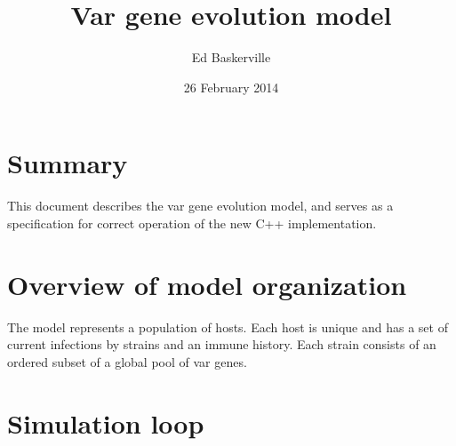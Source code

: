 \documentclass[11pt]{article}
\title{Var gene evolution model}
\author{Ed Baskerville}
\date{26 February 2014}
\begin{document}
\maketitle

\section{Summary}

This document describes the var gene evolution model, and serves as a specification for correct operation of the new C++ implementation.

\section{Overview of model organization}

The model represents a population of hosts. Each host is unique and has a set of current infections by strains and an immune history. Each strain consists of an ordered subset of a global pool of var genes.

\section{Simulation loop}
\end{document}
